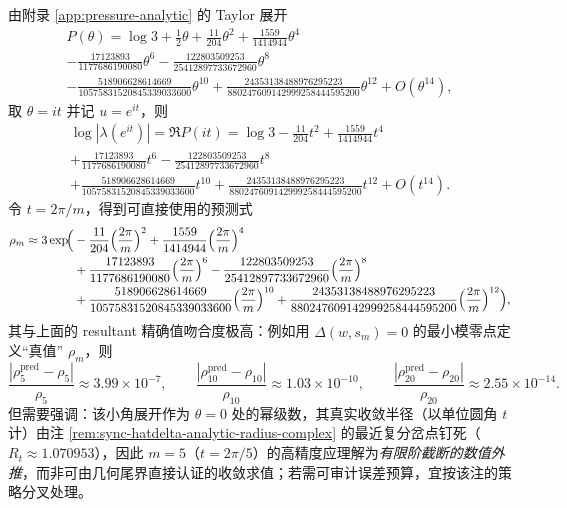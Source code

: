 \begin{remark}\label{rem:sync-rho-pressure-asymp}
由附录 \ref{app:pressure-analytic} 的 Taylor 展开
\[
\begin{aligned}
P(\theta)=\log 3+\frac12\theta+\frac{11}{204}\theta^2+\frac{1559}{1414944}\theta^4\\
-\frac{17123893}{1177686190080}\theta^6-\frac{122803509253}{25412897733672960}\theta^8\\
-\frac{518906628614669}{10575831520845339033600}\theta^{10}
+\frac{24353138488976295223}{880247609142999258444595200}\theta^{12}
+O(\theta^{14}),
\end{aligned}
\]
取 $\theta=it$ 并记 $u=e^{it}$，则
\[
\begin{aligned}
\log|\lambda(e^{it})|=\Re P(it)=\log 3-\frac{11}{204}t^2+\frac{1559}{1414944}t^4\\
+\frac{17123893}{1177686190080}t^6-\frac{122803509253}{25412897733672960}t^8\\
+\frac{518906628614669}{10575831520845339033600}t^{10}
+\frac{24353138488976295223}{880247609142999258444595200}t^{12}
+O(t^{14}).
\end{aligned}
\]
令 $t=2\pi/m$，得到可直接使用的预测式
\[
\begin{aligned}
\rho_m\approx 3\exp\!\Bigl(
&-\frac{11}{204}\Bigl(\frac{2\pi}{m}\Bigr)^2+\frac{1559}{1414944}\Bigl(\frac{2\pi}{m}\Bigr)^4\\
&+\frac{17123893}{1177686190080}\Bigl(\frac{2\pi}{m}\Bigr)^6-\frac{122803509253}{25412897733672960}\Bigl(\frac{2\pi}{m}\Bigr)^8\\
&+\frac{518906628614669}{10575831520845339033600}\Bigl(\frac{2\pi}{m}\Bigr)^{10}
+\frac{24353138488976295223}{880247609142999258444595200}\Bigl(\frac{2\pi}{m}\Bigr)^{12}
\Bigr),
\end{aligned}
\]
其与上面的 resultant 精确值吻合度极高：例如用 $\widehat\Delta(w,s_m)=0$ 的最小模零点定义“真值” $\rho_m$，则
\[
\frac{|\rho_5^{\mathrm{pred}}-\rho_5|}{\rho_5}\approx 3.99\times 10^{-7},\qquad
\frac{|\rho_{10}^{\mathrm{pred}}-\rho_{10}|}{\rho_{10}}\approx 1.03\times 10^{-10},\qquad
\frac{|\rho_{20}^{\mathrm{pred}}-\rho_{20}|}{\rho_{20}}\approx 2.55\times 10^{-14}.
\]
但需要强调：该小角展开作为 \(\theta=0\) 处的幂级数，其真实收敛半径（以单位圆角 \(t\) 计）由注 \ref{rem:sync-hatdelta-analytic-radius-complex} 的最近复分岔点钉死（\(R_t\approx 1.070953\)），因此 \(m=5\)（\(t=2\pi/5\)）的高精度应理解为\emph{有限阶截断的数值外推}，而非可由几何尾界直接认证的收敛求值；若需可审计误差预算，宜按该注的策略分叉处理。
\end{remark}

